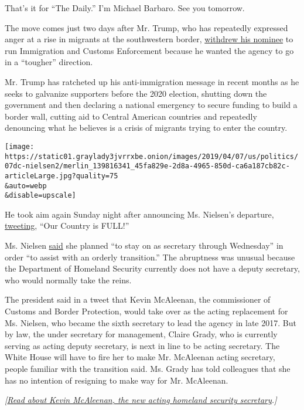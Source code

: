 That's it for ``The Daily.'' I'm Michael Barbaro. See you tomorrow.

The move comes just two days after Mr. Trump, who has repeatedly
expressed anger at a rise in migrants at the southwestern border,
\href{https://www.nytimes3xbfgragh.onion/2019/04/05/us/politics/ronald-vitiello-ice.html}{withdrew
his nominee} to run Immigration and Customs Enforcement because he
wanted the agency to go in a ``tougher'' direction.

Mr. Trump has ratcheted up his anti-immigration message in recent months
as he seeks to galvanize supporters before the 2020 election, shutting
down the government and then declaring a national emergency to secure
funding to build a border wall, cutting aid to Central American
countries and repeatedly denouncing what he believes is a crisis of
migrants trying to enter the country.

\texttt{[image: https://static01.graylady3jvrrxbe.onion/images/2019/04/07/us/politics/07dc-nielsen2/merlin\_139816341\_45fa829e-2d8a-4965-850d-ca6a187cb82c-articleLarge.jpg?quality=75\\\&auto=webp\\\&disable=upscale]}

He took aim again Sunday night after announcing Ms. Nielsen's departure,
\href{https://twitter.com/realDonaldTrump/status/1115057524770844672}{tweeting},
``Our Country is FULL!''

Ms. Nielsen
\href{https://twitter.com/SecNielsen/status/1115080823068332032}{said}
she planned ``to stay on as secretary through Wednesday'' in order ``to
assist with an orderly transition.'' The abruptness was unusual because
the Department of Homeland Security currently does not have a deputy
secretary, who would normally take the reins.

The president said in a tweet that Kevin McAleenan, the commissioner of
Customs and Border Protection, would take over as the acting replacement
for Ms. Nielsen, who became the sixth secretary to lead the agency in
late 2017. But by law, the under secretary for management, Claire Grady,
who is currently serving as acting deputy secretary, is next in line to
be acting secretary. The White House will have to fire her to make Mr.
McAleenan acting secretary, people familiar with the transition said.
Ms. Grady has told colleagues that she has no intention of resigning to
make way for Mr. McAleenan.

\emph{{[}}\href{https://www.nytimes3xbfgragh.onion/2019/04/07/us/politics/kevin-mcaleenan-dhs-cbp.html}{\emph{Read
about Kevin McAleenan, the new acting homeland security
secretary}}\emph{.{]}}

